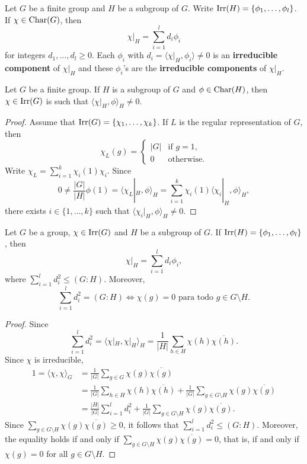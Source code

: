 Let $G$ be a finite group and 
$H$ be a subgroup of $G$. Write 
$\operatorname{Irr}(H)=\{\phi_1,\dots,\phi_l\}$.
If $\chi\in\operatorname{Char}(G)$, then
\[
    \chi|_H=\sum_{i=1}^ld_i\phi_i
\]
for integers $d_1,\dots,d_l\geq 0$. 
Each $\phi_i$ with $d_i=\langle\chi|_H,\phi_i\rangle\ne 0$ 
is an \textbf{irreducible component} of $\chi|_H$ and these 
$\phi_i$'s are the \textbf{irreducible components} of 
$\chi|_H$. 

\begin{proposition}
    Let $G$ be a finite group. 
    If $H$ is a subgroup of $G$ and $\phi\in\operatorname{Char}(H)$, 
    then $\chi\in\operatorname{Irr}(G)$ 
    is such that $\langle\chi|_H,\phi\rangle_H\ne 0$.
\end{proposition}

\begin{proof}
    Assume that $\operatorname{Irr}(G)=\{\chi_1,\dots,\chi_k\}$. 
    If $L$ is the regular representation of $G$, then 
    \[
    \chi_L(g)=\begin{cases}
    |G| & \text{if $g=1$},\\
    0 & \text{otherwise}.
    \end{cases}
    \]
    Write $\chi_L=\sum_{i=1}^k\chi_i(1)\chi_i$. Since 
    \[
    0\ne \frac{|G|}{|H|}\phi(1)=\langle \chi_L|_H,\phi\rangle_H=\sum_{i=1}^k\chi_i(1)\langle\chi_i|_H,\phi\rangle_H,
    \]
    there exists $i\in\{1,\dots,k\}$ 
    such that $\langle\chi_i|_H,\phi\rangle_H\ne 0$. 
\end{proof}

\begin{proposition}
    Let $G$ be a group, $\chi\in\operatorname{Irr}(G)$ and $H$ be a subgroup of $G$. 
    If $\operatorname{Irr}(H)=\{\phi_1,\dots,\phi_l\}$, then 
    \[
    \chi|_H=\sum_{i=1}^ld_i\phi_i,
    \]
    where $\sum_{i=1}^l d_i^2\leq (G:H)$. Moreover, 
    \[
    \sum_{i=1}^l d_i^2=(G:H) 
    \Longleftrightarrow
    \chi(g)=0\text{ para todo $g\in G\setminus H$.}
    \]
\end{proposition}

\begin{proof}
    Since  
    \[
    \sum_{i=1}^ld_i^2=\langle\chi|_H,\chi|_H\rangle_H=\frac{1}{|H|}\sum_{h\in H}\chi(h)\overline{\chi(h)}.
    \]
    Since $\chi$ is irreducible, 
    \begin{align*}
        1=\langle\chi,\chi\rangle_G&=\frac{1}{|G|}\sum_{g\in G}\chi(g)\overline{\chi(g)}\\
        &=\frac{1}{|G|}\sum_{h\in H}\chi(h)\overline{\chi(h)}
        +\frac{1}{|G|}\sum_{g\in G\setminus H}\chi(g)\overline{\chi(g)}\\
        &=\frac{|H|}{|G|}\sum_{i=1}^l d_i^2+\frac{1}{|G|}\sum_{g\in G\setminus H}\chi(g)\overline{\chi(g)}.
    \end{align*}
    Since $\sum_{g\in G\setminus H}\chi(g)\overline{\chi(g)}\geq0$, it follows that
    $\sum_{i=1}^ld_i^2\leq(G:H)$. Moreover, 
    the equality holds if and only if $\sum_{g\in G\setminus H}\chi(g)\overline{\chi(g)}=0$, 
    that is, if and only if $\chi(g)=0$ for all $g\in G\setminus H$.
\end{proof}


